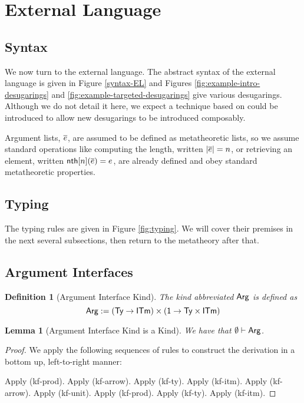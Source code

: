 \documentclass[12pt]{article}
\newtheorem{lemma}{Lemma}
\newtheorem{definition}{Definition}
\begin{document}
\newpage
\section{External Language}
\subsection{Syntax}
We now turn to the external language. The abstract syntax of the external language is given in Figure \ref{syntax-EL} and Figures \ref{fig:example-intro-desugarings} and \ref{fig:example-targeted-desugarings} give various desugarings.  Although we do not detail it here, we expect a technique based on \cite{TSLs} could be introduced to allow new desugarings to be introduced composably. 

Argument lists, $\overline{e}$, are assumed to be defined as metatheoretic lists, so we assume standard operations like computing the length, written $|\overline{e}|=n$, or retrieving an element, written ${\sf nth}[n](\overline{e})=e$, are already defined and obey standard metatheoretic properties.

\subsection{Typing}
The typing rules are given in Figure \ref{fig:typing}. We will cover their premises in the next several subsections, then return to the metatheory after that.

\subsection{Argument Interfaces}

\begin{definition}[Argument Interface Kind]
The kind abbreviated ${\sf Arg}$ is defined as\[{\sf Arg} := ({\sf Ty} \rightarrow {\sf ITm}) \times ({\sf 1} \rightarrow {\sf Ty}\times{\sf ITm})\]
\end{definition}

\begin{lemma}[Argument Interface Kind is a Kind] 
\label{lemma:argument-interface-kind-is-kind}
We have that $\emptyset \vdash {\sf Arg}$.
\end{lemma}
\begin{proof} We apply the following sequences of rules to construct the derivation in a bottom up, left-to-right manner:

Apply (kf-prod). Apply (kf-arrow). Apply (kf-ty). Apply (kf-itm). Apply (kf-arrow). Apply (kf-unit). Apply (kf-prod). Apply (kf-ty). Apply (kf-itm).
\end{proof}
\end{document}
